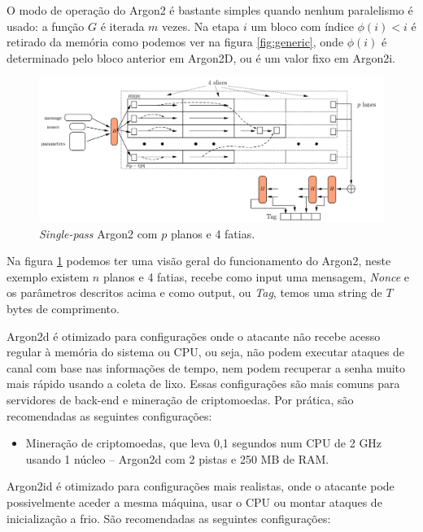 \documentclass[conference]{IEEEtran}
\begin{document}
O modo de operação do Argon2 é bastante simples quando nenhum paralelismo é usado: 
a função ${G}$ é iterada $m$ vezes. Na etapa $i$ um bloco com índice $\phi(i)<i$ é retirado 
da memória como podemos ver na figura \ref{fig:generic}, onde $\phi(i)$ é determinado pelo 
bloco anterior em Argon2D, ou é um valor fixo em Argon2i.

\begin{figure}[ht]
\centering
\includegraphics[scale=0.1]{assets/single-pass-argon2.png}
\caption{\textit{Single-pass} Argon2 com $p$ planos e 4 fatias. }\label{fig:argon2}
\end{figure}

Na figura \ref{fig:argon2} podemos ter uma visão geral do funcionamento do Argon2, 
neste exemplo existem $n$ planos e 4 fatias, recebe como input uma mensagem, \textit{Nonce} 
e os parâmetros descritos acima e como output, ou \textit{Tag}, temos uma string de $T$ 
bytes de comprimento. \cite{argon2spec}

Argon2d é otimizado para configurações onde o atacante não recebe
acesso regular à memória do sistema ou CPU, ou seja, não podem executar
ataques de canal com base nas informações de tempo, nem podem recuperar
a senha muito mais rápido usando a coleta de lixo. Essas configurações
são mais comuns para servidores de back-end e mineração de criptomoedas. Por
prática, são recomendadas as seguintes configurações:

\begin{itemize}
\item Mineração de criptomoedas, que leva 0,1 segundos num CPU de 2 GHz
usando 1 núcleo -- Argon2d com 2 pistas e 250 MB de RAM.
\end{itemize}

Argon2id é otimizado para configurações mais realistas, onde o
atacante pode possivelmente aceder a mesma máquina, usar o CPU ou montar
ataques de inicialização a frio. São recomendadas as seguintes configurações:
\end{document}
